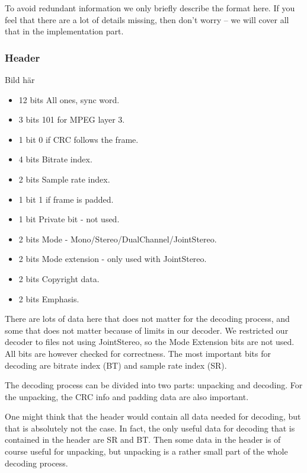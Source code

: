 \documentclass[a4paper,12pt]{article}
\begin{document}
       To avoid redundant information we only briefly describe the format here.
       If you feel that there are a lot of details missing, then don't worry --
       we will cover all that in the implementation part.

       \subsubsection{Header}
       \label{sec:header}
            Bild här \\
            \begin{itemize}
                \item{12 bits} All ones, sync word.
                \item{3 bits} 101 for MPEG layer 3.
                \item{1 bit} 0 if CRC follows the frame.
                \item{4 bits} Bitrate index.
                \item{2 bits} Sample rate index.
                \item{1 bit} 1 if frame is padded.
                \item{1 bit} Private bit - not used.
                \item{2 bits} Mode - Mono/Stereo/DualChannel/JointStereo.
                \item{2 bits} Mode extension - only used with JointStereo.
                \item{2 bits} Copyright data.
                \item{2 bits} Emphasis.
            \end{itemize}
            
            There are lots of data here that does not matter for the decoding
            process, and some that does not matter because of limits in our
            decoder. We restricted our decoder to files not using JointStereo,
            so the Mode Extension bits are not used. All bits are however
            checked for correctness. The most important bits for decoding are
            bitrate index (BT) and sample rate index (SR).

            The decoding process can be divided into two parts: unpacking and
            decoding. For the unpacking, the CRC info and padding data are also
            important.

            One might think that the header would contain all data needed for
            decoding, but that is absolutely not the case. In fact, the only
            useful data for decoding that is contained in the header are SR and
            BT. Then some data in the header is of course useful for unpacking,
            but unpacking is a rather small part of the whole decoding process.
\end{document}
